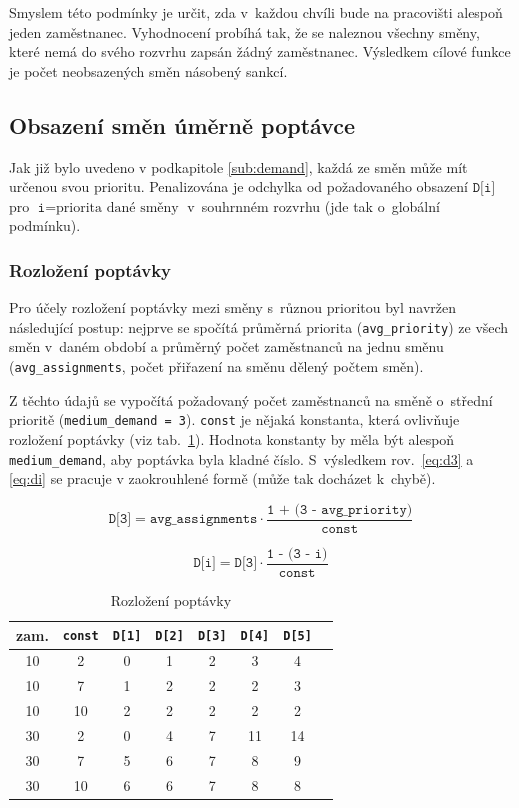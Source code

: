 \documentclass[twoside]{ctuthesis}
\begin{document}
Smyslem této podmínky je určit, zda v~každou chvíli bude na pracovišti alespoň jeden zaměstnanec. Vyhodnocení probíhá tak, že se naleznou všechny směny, které nemá do svého rozvrhu zapsán žádný zaměstnanec. Výsledkem cílové funkce je počet neobsazených směn násobený sankcí.

\subsection{Obsazení směn úměrně poptávce}
Jak již bylo uvedeno v podkapitole \ref{sub:demand}, každá ze směn může mít určenou svou prioritu. Penalizována je odchylka od požadovaného obsazení $\texttt{D[i]}$ pro $\texttt{i} = \mbox{priorita dané směny}$ v~souhrnném rozvrhu (jde tak o~globální podmínku).


\subsubsection{Rozložení poptávky}
Pro účely rozložení poptávky mezi směny s~různou prioritou byl navržen následující postup: nejprve se spočítá průměrná priorita (\texttt{avg\_priority}) ze všech směn v~daném období a průměrný počet zaměstnanců na jednu směnu (\texttt{avg\_assignments}, počet přiřazení na směnu dělený počtem směn).

Z těchto údajů se vypočítá požadovaný počet zaměstnanců na směně o~střední prioritě (\texttt{medium\_demand = 3}). \texttt{const} je nějaká konstanta, která ovlivňuje rozložení poptávky (viz tab.~\ref{tab:demandfactor}). Hodnota konstanty by měla být alespoň \texttt{medium\_demand}, aby poptávka byla kladné číslo. S~výsledkem rov.~\ref{eq:d3} a \ref{eq:di} se pracuje v zaokrouhlené formě (může tak docházet k~chybě).

\begin{equation}
	\label{eq:d3}
	\texttt{D[3]} = \texttt{avg\_assignments} \cdot \frac{\texttt{1 + (3 - avg\_priority})}{\texttt{const}}
\end{equation}

\begin{equation}
	\label{eq:di}
	\texttt{D[i]} = \texttt{D[3]} \cdot \frac{\texttt{1 - (3 - i})}{\texttt{const}}
\end{equation}

\begin{table}[h]
	\caption{Rozložení poptávky}
	\label{tab:demandfactor}
	\begin{tabular}{c|c|cccccc}
		\hline
		zam. & \texttt{const} & \texttt{D[1]} & \texttt{D[2]} & \texttt{D[3]} & \texttt{D[4]} & \texttt{D[5]} \\
		\hline
		\rowcolor{Gray}
		10 & 2 & 0 & 1 & 2 & 3 & 4 \\
		10 & 7 & 1 & 2 & 2 & 2 & 3 \\
		\rowcolor{Gray}
		10 & 10 & 2 & 2 & 2 & 2 & 2 \\
		30 & 2 & 0 & 4 & 7 & 11 & 14 \\
		\rowcolor{Gray}
		30 & 7 & 5 & 6 & 7 & 8 & 9 \\
		30 & 10 & 6 & 6 & 7 & 8 & 8 \\
		\hline
	\end{tabular}
\end{table}
\end{document}

